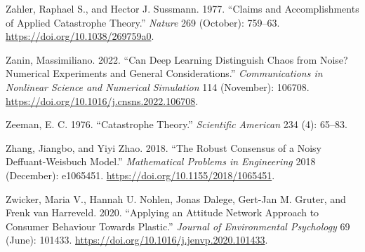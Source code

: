 \documentclass[
  a4paper,
  DIV=11,
  numbers=noendperiod,
  oneside]{scrreprt}
\newlength{\cslhangindent}
\newlength{\cslentryspacingunit} %
\newenvironment{CSLReferences}[2] %
 {%
  \setlength{\parindent}{0pt}
  \ifodd #1
  \let\oldpar\par
  \def\par{\hangindent=\cslhangindent\oldpar}
  \fi
  \setlength{\parskip}{#2\cslentryspacingunit}
 }%
 {}
\begin{document}
\begin{CSLReferences}{1}{0}
\leavevmode{}%
Zahler, Raphael S., and Hector J. Sussmann. 1977. {``Claims and
Accomplishments of Applied Catastrophe Theory.''} \emph{Nature} 269
(October): 759--63. \url{https://doi.org/10.1038/269759a0}.

\leavevmode{}%
Zanin, Massimiliano. 2022. {``Can Deep Learning Distinguish Chaos from
Noise? Numerical Experiments and General Considerations.''}
\emph{Communications in Nonlinear Science and Numerical Simulation} 114
(November): 106708. \url{https://doi.org/10.1016/j.cnsns.2022.106708}.

\leavevmode{}%
Zeeman, E. C. 1976. {``Catastrophe {Theory}.''} \emph{Scientific
American} 234 (4): 65--83.

\leavevmode{}%
Zhang, Jiangbo, and Yiyi Zhao. 2018. {``The {Robust Consensus} of a
{Noisy Deffuant-Weisbuch Model}.''} \emph{Mathematical Problems in
Engineering} 2018 (December): e1065451.
\url{https://doi.org/10.1155/2018/1065451}.

\leavevmode{}%
Zwicker, Maria V., Hannah U. Nohlen, Jonas Dalege, Gert-Jan M. Gruter,
and Frenk van Harreveld. 2020. {``Applying an Attitude Network Approach
to Consumer Behaviour Towards Plastic.''} \emph{Journal of Environmental
Psychology} 69 (June): 101433.
\url{https://doi.org/10.1016/j.jenvp.2020.101433}.

\end{CSLReferences}



\printindex
\end{document}

